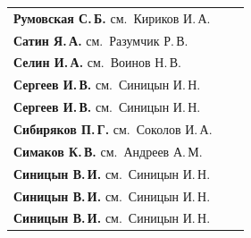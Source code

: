 {\begin{tabular}{p{317.5pt}rr}
\textbf{Румовская С.\,Б.} см.\ Кириков И.\,А.&&\\[.3pt]


\textbf{Сатин Я.\,А.} см.\ Разумчик Р.\,В.&&\\[.3pt]


\textbf{Селин И.\,А.} см.\ Воинов Н.\,В.&&\\[.3pt]


\textbf{Сергеев И.\,В.} см.\ Синицын И.\,Н.&&\\[.3pt]


\textbf{Сергеев И.\,В.} см.\ Синицын И.\,Н.&&\\[.3pt]


\textbf{Сибиряков П.\,Г.} см.\ Соколов И.\,А.&&\\[.3pt]


\textbf{Симаков К.\,В.} см.\ Андреев А.\,М.&&\\[.3pt]


\textbf{Синицын В.\,И.} см.\ Синицын И.\,Н.&&\\[.3pt]


\textbf{Синицын В.\,И.} см.\ Синицын И.\,Н.&&\\[.3pt]


\textbf{Синицын В.\,И.} см.\ Синицын И.\,Н.&&\\[.3pt]


\end{tabular}


}


\pagebreak





\def\rightkol{АВТОРСКИЙ УКАЗАТЕЛЬ ЗА 2015 г.}


\def\leftkol{АВТОРСКИЙ УКАЗАТЕЛЬ ЗА 2015 г.}





\noindent


